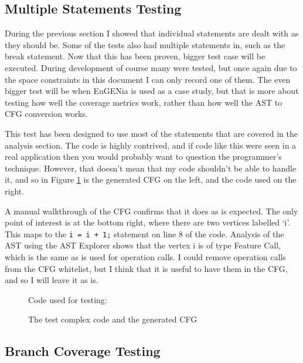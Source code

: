 \subsection{Multiple Statements Testing}

During the previous section I showed that individual statements are dealt with as they should be. Some of the tests also had multiple statements in, such as the break statement. Now that this has been proven, bigger test case will be executed. During development of course many were tested, but once again due to the space constraints in this document I can only record one of them. The even bigger test will be when EuGENia is used as a case study, but that is more about testing how well the coverage metrics work, rather than how well the AST to CFG conversion works.

This test has been designed to use most of the statements that are covered in the analysis section. The code is highly contrived, and if code like this were seen in a real application then you would probably want to question the programmer's technique. However, that doesn't mean that my code shouldn't be able to handle it, and so in Figure \ref{fig:testComplex} is the generated CFG on the left, and the code used on the right.

A manual walkthrough of the CFG confirms that it does as is expected. The only point of interest is at the bottom right, where there are two vertices labelled `i'. This maps to the \verb|i = i + 1;| statement on line 8 of the code. Analysis of the AST using the AST Explorer shows that the vertex i is of type Feature Call, which is the same as is used for operation calls. I could remove operation calls from the CFG whitelist, but I think that it is useful to have them in the CFG, and so I will leave it as is.

\begin{figure}
\begin{minipage}{.6\textwidth}
\centering
\end{minipage}
\begin{minipage}{.39\textwidth}
  \centering
  Code used for testing:
  
\end{minipage}
\caption{The test complex code and the generated CFG}
\label{fig:testComplex}
\end{figure}


\subsection{Branch Coverage Testing}

